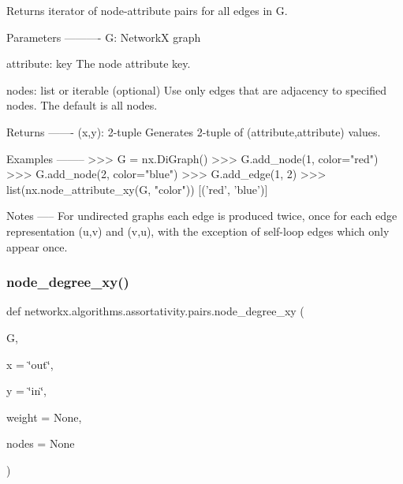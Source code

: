 \begin{DoxyVerb}Returns iterator of node-attribute pairs for all edges in G.

Parameters
----------
G: NetworkX graph

attribute: key
   The node attribute key.

nodes: list or iterable (optional)
    Use only edges that are adjacency to specified nodes.
    The default is all nodes.

Returns
-------
(x,y): 2-tuple
    Generates 2-tuple of (attribute,attribute) values.

Examples
--------
>>> G = nx.DiGraph()
>>> G.add_node(1, color="red")
>>> G.add_node(2, color="blue")
>>> G.add_edge(1, 2)
>>> list(nx.node_attribute_xy(G, "color"))
[('red', 'blue')]

Notes
-----
For undirected graphs each edge is produced twice, once for each edge
representation (u,v) and (v,u), with the exception of self-loop edges
which only appear once.
\end{DoxyVerb}
 \mbox{\label{namespacenetworkx_1_1algorithms_1_1assortativity_1_1pairs_a168f6a2f4bac098496e44fb31f9c4339}} 
\subsubsection{\texorpdfstring{node\+\_\+degree\+\_\+xy()}{node\_degree\_xy()}}
{\footnotesize\ttfamily def networkx.\+algorithms.\+assortativity.\+pairs.\+node\+\_\+degree\+\_\+xy (\begin{DoxyParamCaption}\item[{}]{G,  }\item[{}]{x = {\ttfamily \char`\"{}out\char`\"{}},  }\item[{}]{y = {\ttfamily \char`\"{}in\char`\"{}},  }\item[{}]{weight = {\ttfamily None},  }\item[{}]{nodes = {\ttfamily None} }\end{DoxyParamCaption})}

